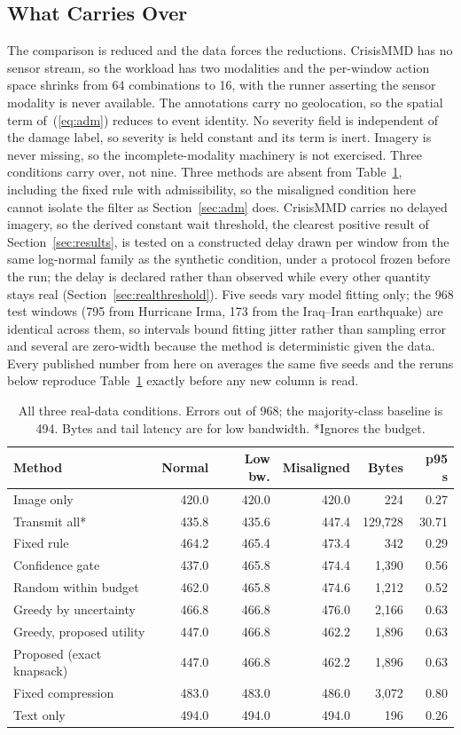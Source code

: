 \documentclass[conference,a4paper]{IEEEtran}
\makeatletter
\newcommand{\tablereal}{%
\begin{table}[t]
\caption{All three real-data conditions. Errors out of 968; the majority-class baseline is 494. Bytes and tail latency are for low bandwidth. *Ignores the budget.}
\label{tab:real}
\centering\scriptsize
\setlength{\tabcolsep}{2pt}
\begin{tabular}{@{}p{2.25cm}rrrrr@{}}
\toprule
Method & Normal & Low bw. & Misaligned & Bytes & p95 s \\
\midrule
Image only & 420.0 & 420.0 & 420.0 & 224 & 0.27 \\
Transmit all* & 435.8 & 435.6 & 447.4 & 129,728 & 30.71 \\
Fixed rule & 464.2 & 465.4 & 473.4 & 342 & 0.29 \\
Confidence gate & 437.0 & 465.8 & 474.4 & 1,390 & 0.56 \\
Random within budget & 462.0 & 465.8 & 474.6 & 1,212 & 0.52 \\
Greedy by uncertainty & 466.8 & 466.8 & 476.0 & 2,166 & 0.63 \\
Greedy, proposed utility & 447.0 & 466.8 & 462.2 & 1,896 & 0.63 \\
Proposed (exact knapsack) & 447.0 & 466.8 & 462.2 & 1,896 & 0.63 \\
Fixed compression & 483.0 & 483.0 & 486.0 & 3,072 & 0.80 \\
Text only & 494.0 & 494.0 & 494.0 & 196 & 0.26 \\
\bottomrule
\end{tabular}
\end{table}
}
\makeatother
\begin{document}
\subsection{What Carries Over}
The comparison is reduced and the data forces the reductions. CrisisMMD has no sensor
stream, so the workload has two modalities and the per-window action space shrinks from 64
combinations to 16, with the runner asserting the sensor modality is never available. The annotations carry no
geolocation, so the spatial term of~(\ref{eq:adm}) reduces to event identity. No severity
field is independent of the damage label, so severity is held constant and its term is
inert. Imagery is never missing, so the incomplete-modality machinery is not exercised.
Three conditions carry over, not nine. Three methods are absent from Table~\ref{tab:real}, including the fixed
rule with admissibility, so the misaligned condition here cannot isolate the filter as
Section~\ref{sec:adm} does. CrisisMMD carries no delayed imagery, so the derived constant
wait threshold, the clearest positive result of Section~\ref{sec:results}, is tested on a constructed delay drawn per window from the same log-normal family as the synthetic condition, under a protocol frozen before the run; the delay is declared rather than observed while every other quantity stays real (Section~\ref{sec:realthreshold}).
Five seeds vary model fitting only; the 968 test windows (795 from Hurricane Irma, 173 from the Iraq--Iran earthquake) are identical across them, so intervals bound fitting jitter rather than sampling error and several are zero-width because the method is deterministic given the data. Every published number from here on averages the same five seeds and the reruns below reproduce Table~\ref{tab:real} exactly before any new column is read.

\tablereal
\end{document}
